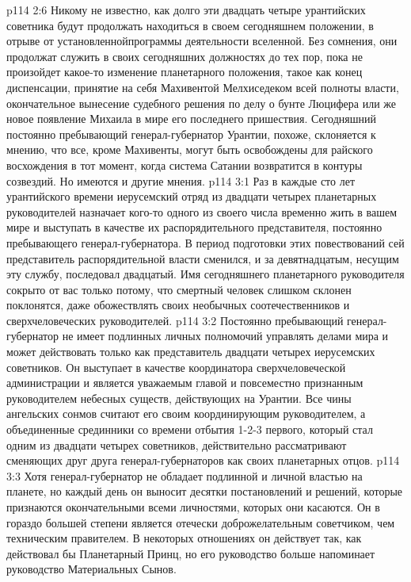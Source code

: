 \vs p114 2:6 Никому не известно, как долго эти двадцать четыре урантийских советника будут продолжать находиться в своем сегодняшнем положении, в отрыве от установленнойпрограммы деятельности вселенной. Без сомнения, они продолжат служить в своих сегодняшних должностях до тех пор, пока не произойдет какое\hyp{}то изменение планетарного положения, такое как конец диспенсации, принятие на себя Махивентой Мелхиседеком всей полноты власти, окончательное вынесение судебного решения по делу о бунте Люцифера или же новое появление Михаила в мире его последнего пришествия. Сегодняшний постоянно пребывающий генерал\hyp{}губернатор Урантии, похоже, склоняется к мнению, что все, кроме Махивенты, могут быть освобождены для райского восхождения в тот момент, когда система Сатании возвратится в контуры созвездий. Но имеются и другие мнения.
\vs p114 3:1 Раз в каждые сто лет урантийского времени иерусемский отряд из двадцати четырех планетарных руководителей назначает кого\hyp{}то одного из своего числа временно жить в вашем мире и выступать в качестве их распорядительного представителя, постоянно пребывающего генерал\hyp{}губернатора. В период подготовки этих повествований сей представитель распорядительной власти сменился, и за девятнадцатым, несущим эту службу, последовал двадцатый. Имя сегодняшнего планетарного руководителя сокрыто от вас только потому, что смертный человек слишком склонен поклонятся, даже обожествлять своих необычных соотечественников и сверхчеловеческих руководителей.
\vs p114 3:2 Постоянно пребывающий генерал\hyp{}губернатор не имеет подлинных личных полномочий управлять делами мира и может действовать только как представитель двадцати четырех иерусемских советников. Он выступает в качестве координатора сверхчеловеческой администрации и является уважаемым главой и повсеместно признанным руководителем небесных существ, действующих на Урантии. Все чины ангельских сонмов считают его своим координирующим руководителем, а объединенные срединники со времени отбытия 1\hyp{}2\hyp{}3 первого, который стал одним из двадцати четырех советников, действительно рассматривают сменяющих друг друга генерал\hyp{}губернаторов как своих планетарных отцов.
\vs p114 3:3 Хотя генерал\hyp{}губернатор не обладает подлинной и личной властью на планете, но каждый день он выносит десятки постановлений и решений, которые признаются окончательными всеми личностями, которых они касаются. Он в гораздо большей степени является отечески доброжелательным советчиком, чем техническим правителем. В некоторых отношениях он действует так, как действовал бы Планетарный Принц, но его руководство больше напоминает руководство Материальных Сынов.
